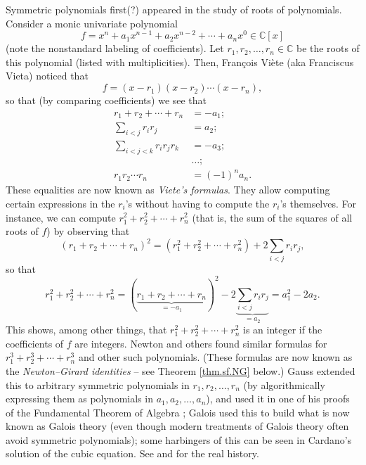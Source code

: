Symmetric polynomials first(?) appeared in the study of roots of polynomials.
Consider a monic univariate polynomial%
\[
f=x^{n}+a_{1}x^{n-1}+a_{2}x^{n-2}+\cdots+a_{n}x^{0}\in\mathbb{C}\left[
x\right]
\]
(note the nonstandard labeling of coefficients). Let $r_{1},r_{2},\ldots
,r_{n}\in\mathbb{C}$ be the roots of this polynomial (listed with
multiplicities). Then, Fran\c{c}ois Vi\`{e}te (aka Franciscus Vieta) noticed
that%
\[
f=\left(  x-r_{1}\right)  \left(  x-r_{2}\right)  \cdots\left(  x-r_{n}%
\right)  ,
\]
so that (by comparing coefficients) we see that%
\begin{align*}
r_{1}+r_{2}+\cdots+r_{n}  &  =-a_{1};\\
\sum_{i<j}r_{i}r_{j}  &  =a_{2};\\
\sum_{i<j<k}r_{i}r_{j}r_{k}  &  =-a_{3};\\
&  \ldots;\\
r_{1}r_{2}\cdots r_{n}  &  =\left(  -1\right)  ^{n}a_{n}.
\end{align*}
These equalities are now known as \emph{Viete's formulas}. They allow
computing certain expressions in the $r_{i}$'s without having to compute the
$r_{i}$'s themselves. For instance, we can compute $r_{1}^{2}+r_{2}^{2}%
+\cdots+r_{n}^{2}$ (that is, the sum of the squares of all roots of $f$) by
observing that%
\[
\left(  r_{1}+r_{2}+\cdots+r_{n}\right)  ^{2}=\left(  r_{1}^{2}+r_{2}%
^{2}+\cdots+r_{n}^{2}\right)  +2\sum_{i<j}r_{i}r_{j},
\]
so that%
\[
r_{1}^{2}+r_{2}^{2}+\cdots+r_{n}^{2}=\left(  \underbrace{r_{1}+r_{2}%
+\cdots+r_{n}}_{=-a_{1}}\right)  ^{2}-2\underbrace{\sum_{i<j}r_{i}r_{j}%
}_{=a_{2}}=a_{1}^{2}-2a_{2}.
\]
This shows, among other things, that $r_{1}^{2}+r_{2}^{2}+\cdots+r_{n}^{2}$ is
an integer if the coefficients of $f$ are integers. Newton and others found
similar formulas for $r_{1}^{3}+r_{2}^{3}+\cdots+r_{n}^{3}$ and other such
polynomials. (These formulas are now known as the \emph{Newton--Girard
identities} -- see Theorem \ref{thm.sf.NG} below.) Gauss extended this to
arbitrary symmetric polynomials in $r_{1},r_{2},\ldots,r_{n}$ (by
algorithmically expressing them as polynomials in $a_{1},a_{2},\ldots,a_{n}$),
and used it in one of his proofs of the Fundamental Theorem of Algebra
\cite{Gauss16}; Galois used this to build what is now known as Galois theory
(even though modern treatments of Galois theory often avoid symmetric
polynomials); some harbingers of this can be seen in Cardano's solution of the
cubic equation. See \cite{Tignol16} and \cite{Armstrong-561fa18sp19} for the
real history.

